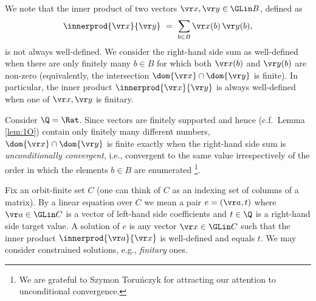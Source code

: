 We note that the inner product of two vectors $\vr x, \vr y\in\GLin B$, defined as
\[
\innerprod {\vr x} {\vr y} \ = \ \sum_{b\in B} \vr x(b)\, \vr y(b),
\]
is not always well-defined.
We consider the right-hand side sum as well-defined when there are only finitely many $b\in B$
for which both $\vr x(b)$ and $\vr y(b)$ are non-zero
(equivalently, the intersection $\dom {\vr x} \cap \dom {\vr y}$ is finite).
In particular, the inner product $\innerprod {\vr x} {\vr y}$ is always well-defined when one of $\vr x, \vr y$ is finitary.
%
\begin{slremark}
Consider $\Q = \Rat$. %
Since vectors are finitely supported and hence (c.f.~Lemma \ref{lem:1O}) contain only finitely many different numbers, 
$\dom {\vr x} \cap \dom {\vr y}$ is finite exactly when 
the right-hand side sum is \emph{unconditionally convergent},
i.e., convergent to the same value irrespectively of the order in which
the elements $b\in B$ are enumerated%
\footnote{We are grateful to Szymon Toru{\'n}czyk for attracting our attention to unconditional convergence.}.
\end{slremark}


Fix an orbit-finite set $C$ (one can think of $C$ as an indexing set of columns of a matrix).
%
By a linear equation over $C$ we mean a pair $e = (\vr a, t)$ where 
$\vr a \in\GLin C$ is a vector of left-hand side coefficients and $t\in\Q$ is a right-hand side target value.
A solution of $e$ is any vector $\vr x\in\GLin C$ such that the inner product
$\innerprod {\vr a} {\vr x}$ is well-defined and equals $t$.
We may consider constrained solutions, e.g., 
\emph{finitary} ones.


